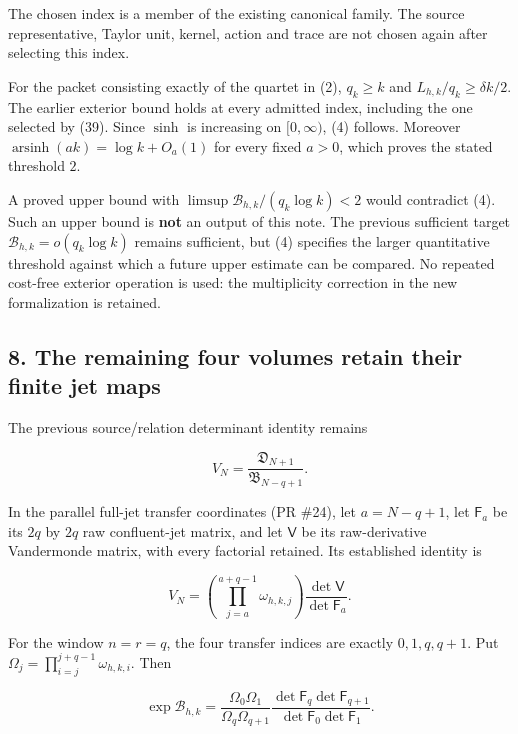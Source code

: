 The chosen index is a member of the existing canonical family. The source representative, Taylor unit, kernel, action and trace are not chosen again after selecting this index.

For the packet consisting exactly of the quartet in (2), \(q_k\ge k\) and \(L_{h,k}/q_k\ge\delta k/2\). The earlier exterior bound holds at every admitted index, including the one selected by (39). Since \(\sinh\) is increasing on \([0,\infty)\), (4) follows. Moreover \(\operatorname{arsinh}(ak)=\log k+O_a(1)\) for every fixed \(a>0\), which proves the stated threshold \(2\).

A proved upper bound with \(\limsup\mathcal B_{h,k}/(q_k\log k)<2\) would contradict (4). Such an upper bound is \textbf{not} an output of this note. The previous sufficient target \(\mathcal B_{h,k}=o(q_k\log k)\) remains sufficient, but (4) specifies the larger quantitative threshold against which a future upper estimate can be compared. No repeated cost-free exterior operation is used: the multiplicity correction in the new formalization is retained.

\subsection{8. The remaining four volumes retain their finite jet maps}\label{zlm:endpoint-arithmetic_original--the-remaining-four-volumes-retain-their-finite-jet-maps}

The previous source/relation determinant identity remains

\[
 V_N=\frac{\mathfrak D_{N+1}}{\mathfrak B_{N-q+1}}.
                                                                         \tag{40}
\]

In the parallel full-jet transfer coordinates (PR \#24), let \(a=N-q+1\), let \(\mathsf F_a\) be its \(2q\) by \(2q\) raw confluent-jet matrix, and let \(\mathsf V\) be its raw-derivative Vandermonde matrix, with every factorial retained. Its established identity is

\[
 V_N=\left(\prod_{j=a}^{a+q-1}\omega_{h,k,j}\right)
                       \frac{\det\mathsf V}{\det\mathsf F_a}.           \tag{41}
\]

For the window \(n=r=q\), the four transfer indices are exactly \(0,1,q,q+1\). Put \(\Omega_j=\prod_{i=j}^{j+q-1}\omega_{h,k,i}\). Then

\[
 \boxed{
 \exp\mathcal B_{h,k}
 =\frac{\Omega_0\Omega_1}{\Omega_q\Omega_{q+1}}
   \frac{\det\mathsf F_q\det\mathsf F_{q+1}}
        {\det\mathsf F_0\det\mathsf F_1}.
 }                                                                     \tag{42}
\]

